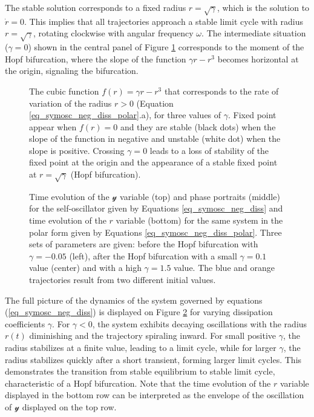 \documentclass{article}
\begin{document}
The stable solution corresponds to a fixed radius $r = \sqrt{\gamma}$, which is the solution to $\dot{r} = 0$. This implies that all trajectories approach a stable limit cycle with radius $r = \sqrt{\gamma}$, rotating clockwise with angular frequency $\omega$. The intermediate situation ($\gamma = 0$) shown in the central panel of Figure \ref{fig_cubic} corresponds to the moment of the Hopf bifurcation, where the slope of the function $\gamma r - r^3$ becomes horizontal at the origin, signaling the bifurcation.

\begin{figure} [h]
    \centerline{}
    \caption{The cubic function $f(r)=\gamma r - r^3$ that corresponds to the rate of variation of the radius $r>0$ (Equation \ref{eq_symosc_neg_diss_polar}.a), for three values of $\gamma$. Fixed point appear when $f(r)=0$ and they are stable (black dots) when the slope of the function in negative and unstable (white dot) when the slope is positive. Crossing $\gamma=0$ leads to a loss of stability of the fixed point at the origin and the appearance of a stable fixed point at $r=\sqrt{\gamma}$ (Hopf bifurcation). } 
    \label{fig_cubic}
\end{figure}






\begin{figure} [h]
    \centerline{}
    \caption{Time evolution of the $\mathscr{y}$ variable (top) and phase portraits (middle) for the self-oscillator given by Equations \ref{eq_symosc_neg_diss} and time evolution of the $r$ variable (bottom) for the same system in the polar form given by Equations \ref{eq_symosc_neg_diss_polar}. 
    Three sets of parameters are given: before the Hopf bifurcation with $\gamma = -0.05$ (left), after the Hopf bifurcation with a small $\gamma = 0.1$ value (center) and with a high $\gamma = 1.5$ value.
    The blue and orange trajectories result from two different initial values.}
    \label{fig_symself}
\end{figure}

The full picture of the dynamics of the system governed by equations (\ref{eq_symosc_neg_diss}) is displayed on Figure \ref{fig_symself} for varying dissipation coefficients $\gamma$. 
For $\gamma < 0$, the system exhibits decaying oscillations with the radius $r(t)$ diminishing and the trajectory spiraling inward. For small positive $\gamma$, the radius stabilizes at a finite value, leading to a limit cycle, while for larger $\gamma$, the radius stabilizes quickly after a short transient, forming larger limit cycles. This demonstrates the transition from stable equilibrium to stable limit cycle, characteristic of a Hopf bifurcation. 
Note that the time evolution of the $r$ variable displayed in the bottom row can be interpreted as the envelope of the oscillation of $\mathscr{y}$ displayed on the top row. 
\end{document}
